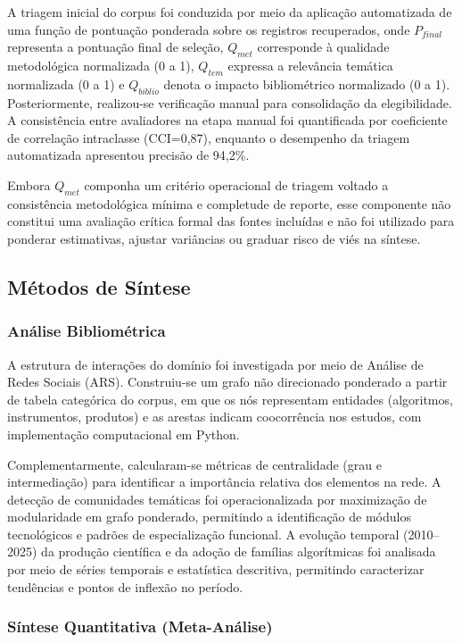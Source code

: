 \documentclass[lineno,pdflatex,sn-apa]{sn-jnl}%
\begin{document}
A triagem inicial do corpus foi conduzida por meio da aplicação automatizada de uma função de pontuação ponderada sobre os registros recuperados, onde $P_{final}$ representa a pontuação final de seleção, $Q_{met}$ corresponde à qualidade metodológica normalizada (0 a 1), $Q_{tem}$ expressa a relevância temática normalizada (0 a 1) e $Q_{biblio}$ denota o impacto bibliométrico normalizado (0 a 1). Posteriormente, realizou-se verificação manual para consolidação da elegibilidade. A consistência entre avaliadores na etapa manual foi quantificada por coeficiente de correlação intraclasse (CCI=0,87), enquanto o desempenho da triagem automatizada apresentou precisão de 94,2\%.

Embora $Q_{met}$ componha um critério operacional de triagem voltado a consistência metodológica mínima e completude de reporte, esse componente não constitui uma avaliação crítica formal das fontes incluídas e não foi utilizado para ponderar estimativas, ajustar variâncias ou graduar risco de viés na síntese.

\subsection[Métodos de Síntese]{Métodos de Síntese}

\subsubsection[Análise Bibliométrica]{Análise Bibliométrica}

A estrutura de interações do domínio foi investigada por meio de Análise de Redes Sociais (ARS). Construiu-se um grafo não direcionado ponderado a partir de tabela categórica do corpus, em que os nós representam entidades (algoritmos, instrumentos, produtos) e as arestas indicam coocorrência nos estudos, com implementação computacional em Python.

Complementarmente, calcularam-se métricas de centralidade (grau e intermediação) para identificar a importância relativa dos elementos na rede. A detecção de comunidades temáticas foi operacionalizada por maximização de modularidade em grafo ponderado, permitindo a identificação de módulos tecnológicos e padrões de especialização funcional. A evolução temporal (2010--2025) da produção científica e da adoção de famílias algorítmicas foi analisada por meio de séries temporais e estatística descritiva, permitindo caracterizar tendências e pontos de inflexão no período.

\subsubsection[Síntese Quantitativa]{Síntese Quantitativa (Meta-Análise)}
\end{document}
